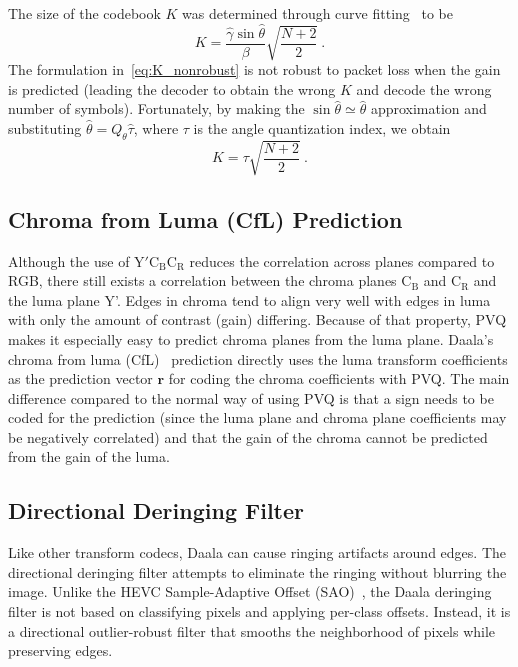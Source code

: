 \documentclass[english,conference,10pt]{IEEEtran}
\begin{document}
The size of the codebook $K$ was determined through curve
fitting~\cite{valin2015spie} to be
\begin{equation}
K = \frac{\hat{\gamma}\sin\hat{\theta}}{\beta}\sqrt{\frac{N+2}{2}}\ .
\label{eq:K_nonrobust}
\end{equation}
The formulation in~\cref{eq:K_nonrobust} is not robust to packet loss when
the gain is predicted (leading the decoder to obtain the wrong $K$ and decode
the wrong number of symbols). Fortunately, by making the $\sin{\hat{\theta}}
\simeq \hat{\theta}$ approximation and substituting $\hat{\theta} = 
Q_\theta\hat{\tau}$, where $\tau$ is the angle quantization index, we obtain
\begin{equation}
K = \tau \sqrt{\frac{N+2}{2}}\ .
\end{equation}


\subsection{Chroma from Luma (CfL) Prediction}

Although the use of $\mathrm{Y'C_BC_R}$ reduces the correlation across planes
compared to RGB, there still exists a correlation between the chroma planes
$\mathrm{C_B}$ and $\mathrm{C_R}$ and the luma plane Y'. Edges in chroma tend to
align very well with edges in luma with only the amount of contrast (gain) differing.
Because of that property, PVQ makes it especially easy to predict
chroma planes from the luma plane. Daala's chroma from luma (CfL)~\cite{egge2015spie}
prediction directly uses the luma transform coefficients as the prediction vector
$\mathbf{r}$ for coding the chroma coefficients with PVQ. The main difference compared
to the normal way of using PVQ is that a sign needs to be coded for the prediction
(since the luma plane and chroma plane coefficients may be negatively correlated) and
that the gain of the chroma cannot be predicted from the gain of the luma.


\subsection{Directional Deringing Filter}
\label{sec:deringing}

Like other transform codecs, Daala can cause ringing artifacts around edges.
The directional deringing filter attempts to eliminate the ringing without
blurring the image. Unlike the HEVC Sample-Adaptive Offset (SAO)~\cite{HEVC-SAO},
the Daala deringing filter is not based on classifying pixels and applying per-class
offsets. Instead, it is a directional outlier-robust filter that smooths the
neighborhood of pixels while preserving edges.
\end{document}
